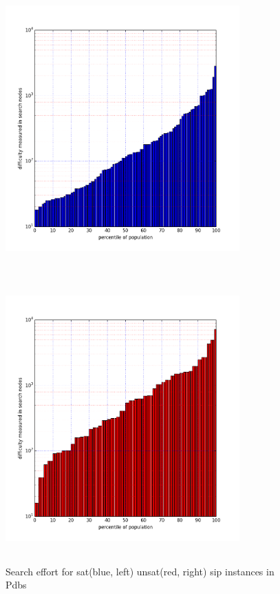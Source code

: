 \documentclass{l4proj}
\begin{document}
\begin{figure}
\centering
\begin{minipage}[t]{.5\textwidth}
  \centering
  \includegraphics[height=11cm,width=9cm]{images/plots/pdbsSAT.png}
\end{minipage}%
\begin{minipage}[t]{.5\textwidth}
  \centering
  \includegraphics[height=11cm,width=9cm]{images/plots/pdbsUNSAT.png}
\end{minipage}
\caption{Search effort for \gls{sat}(blue, left) \gls{unsat}(red, right) \gls{sip} instances in Pdbs}
\label{fig:pdbsSatUnsat}
\end{figure}
\end{document}
